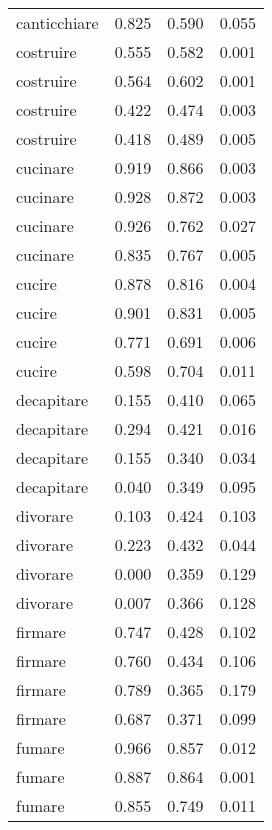 \begin{longtable}{l|rrr}
canticchiare   & 0.825  & 0.590      & 0.055         \\
costruire      & 0.555  & 0.582     & 0.001         \\
costruire      & 0.564  & 0.602     & 0.001         \\
costruire      & 0.422  & 0.474     & 0.003         \\
costruire      & 0.418  & 0.489     & 0.005         \\
cucinare       & 0.919  & 0.866     & 0.003         \\
cucinare       & 0.928  & 0.872     & 0.003         \\
cucinare       & 0.926  & 0.762     & 0.027         \\
cucinare       & 0.835  & 0.767     & 0.005         \\
cucire         & 0.878  & 0.816     & 0.004         \\
cucire         & 0.901  & 0.831     & 0.005         \\
cucire         & 0.771  & 0.691     & 0.006         \\
cucire         & 0.598  & 0.704     & 0.011         \\
decapitare     & 0.155  & 0.410      & 0.065         \\
decapitare     & 0.294  & 0.421     & 0.016         \\
decapitare     & 0.155  & 0.340      & 0.034         \\
decapitare     & 0.040   & 0.349     & 0.095         \\
divorare       & 0.103  & 0.424     & 0.103         \\
divorare       & 0.223  & 0.432     & 0.044         \\
divorare       & 0.000      & 0.359     & 0.129         \\
divorare       & 0.007  & 0.366     & 0.128         \\
firmare        & 0.747  & 0.428     & 0.102         \\
firmare        & 0.760   & 0.434     & 0.106         \\
firmare        & 0.789  & 0.365     & 0.179         \\
firmare        & 0.687  & 0.371     & 0.099         \\
fumare         & 0.966  & 0.857     & 0.012         \\
fumare         & 0.887  & 0.864     & 0.001         \\
fumare         & 0.855  & 0.749     & 0.011         \\

\end{longtable}
